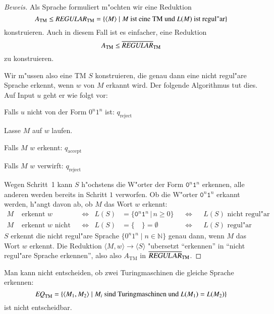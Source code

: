 \begin{proof}[Beweis]
Als Sprache formuliert m"ochten wir eine Reduktion 
\[
A_{\text{TM}}\le\text{\it REGULAR}_{\text{TM}}=\{
\langle M\rangle\;|\;\text{$M$ ist eine TM und $L(M)$ ist regul"ar}
\}
\]
konstruieren. Auch in diesem Fall ist es einfacher, eine
Reduktion
\[
A_{\text{TM}}\le\overline{\text{\it REGULAR}}_{\text{TM}}
\]
zu konstruieren.

Wir m"ussen also eine TM $S$ konstruieren, die genau
dann eine nicht regul"are Sprache erkennt, wenn $w$ von $M$ erkannt wird.
Der folgende Algorithmus tut dies. Auf Input $u$ geht er wie folgt
vor:
\medskip
\begin{compactenum}
\item Falls $u$ nicht von der Form $0^n1^n$ ist: $q_{\text{reject}}$
\item Lasse $M$ auf $w$ laufen.
\item Falls $M$ $w$ erkennt: $q_{\text{accept}}$
\item Falls $M$ $w$ verwirft: $q_{\text{reject}}$
\end{compactenum}
\medskip
Wegen Schritt~1 kann $S$ h"ochstens die W"orter der Form
$\texttt{0}^n\texttt{1}^n$ erkennen, alle anderen werden bereits in
Schritt $1$ verworfen.
Ob die W"orter 
$\texttt{0}^n\texttt{1}^n$ erkannt werden, h"angt davon ab, ob $M$ das Wort
$w$ erkennt:
\begin{align*}
   M&\text{ erkennt $w$}      &
    &\Leftrightarrow&
L(S)&=\{\texttt{0}^n\texttt{1}^n\,|\, n\ge 0\}&
    &\Leftrightarrow&
    &\text{$L(S)$ nicht regul"ar}\\
   M&\text{ erkennt $w$ nicht}&
    &\Leftrightarrow&
L(S)&=\{\quad\}=\emptyset&
    &\Leftrightarrow&
    &\text{$L(S)$ regul"ar}
\end{align*}
$S$ erkennt die nicht regul"are Sprache $\{0^n1^n\;|\;n\in\mathbb N\}$
genau dann, wenn $M$ das Wort $w$ erkennt.
Die Reduktion $\langle M,w\rangle\to \langle S\rangle$ "ubersetzt
``erkennen'' in ``nicht regul"are Sprache erkennen'', also also $A_{\text{TM}}$
in $\overline{\textsl{REGULAR}}_{\text{TM}}$.
\end{proof}

\begin{satz}
Man kann nicht entscheiden, ob zwei Turingmaschinen die gleiche Sprache
erkennen:
\[
\text{\it EQ}_{\text{TM}}=\{
\langle M_1,M_2\rangle\;|\;\text{$M_i$ sind Turingmaschinen und $L(M_1)=L(M_2)$}
\}
\]
ist nicht entscheidbar.
\end{satz}

